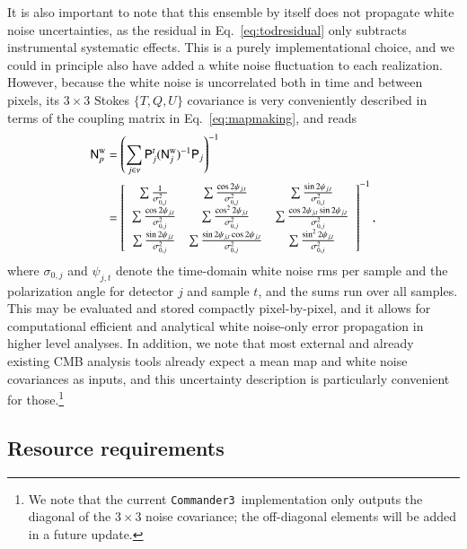 \documentclass[twocolumn]{aa}
\def\commanderthree{\texttt{Commander3}}
\newcommand{\N}[0]{\tens{N}}
\renewcommand{\P}[0]{\tens{P}}
\begin{document}
It is also important to note that this ensemble by itself does
not propagate white noise uncertainties, as the residual in
Eq.~\eqref{eq:todresidual} only subtracts instrumental systematic
effects. This is a purely implementational choice, and we could in
principle also have added a white noise fluctuation to each
realization. However, because the white noise is uncorrelated both
in time and between pixels, its $3\times 3$ Stokes $\{T,Q,U\}$ covariance
is very conveniently described in terms of the coupling matrix in
Eq.~\eqref{eq:mapmaking}, and reads
\begin{align}
\N^{\mathrm{w}}_{p} &= \left(\sum_{j \in \nu} \P_j^t
(\N^{\mathrm{w}}_{j})^{-1} \P_j\right)^{-1}\\
  &= \left[\begin{array}{ccc}
      \sum \frac{1}{\sigma_{0,j}^2} & \sum \frac{\cos
        2\psi_{j,t}}{\sigma_{0,j}^2} & \sum \frac{\sin
        2\psi_{j,t}}{\sigma_{0,j}^2} \\
            \sum \frac{\cos 2\psi_{j,t}}{\sigma_{0,j}^2} & \sum \frac{\cos^2
        2\psi_{j,t}}{\sigma_{0,j}^2} & \sum \frac{\cos 2\psi_{j,t} \sin
              2\psi_{j,t}}{\sigma_{0,j}^2} \\
                  \sum \frac{\sin 2\psi_{j,t}}{\sigma_{0,j}^2} & \sum
                  \frac{\sin 2\psi_{j,t} \cos
        2\psi_{j,t}}{\sigma_{0,j}^2} & \sum \frac{\sin^2
        2\psi_{j,t}}{\sigma_{0,j}^2}
    \end{array}\right]^{-1},
  \label{eq:n_wn}
\end{align}
where $\sigma_{0,j}$ and $\psi_{j,t}$ denote the time-domain white
noise rms per sample and the polarization angle for detector $j$ and
sample $t$, and the sums run over all samples. This may be evaluated
and stored compactly pixel-by-pixel, and it allows for
computational efficient and analytical white noise-only error
propagation in higher level analyses. In addition, we note that most
external and already existing CMB analysis tools already expect a mean
map and white noise covariances as inputs, and this uncertainty
description is particularly convenient for those.\footnote{We note
  that the current \commanderthree\ implementation only outputs the
  diagonal of the $3\times3$ noise covariance; the off-diagonal
  elements will be added in a future update.}



\subsection{Resource requirements}
\end{document}

